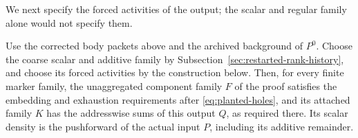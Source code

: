 We next specify the forced activities of the output; the scalar and
regular family alone would not specify them.
\begin{proposition}
\label{prop:corrected-forced-output}
Use the corrected body packets above and the archived background of
$P^0$. Choose the coarse scalar and additive family by
Subsection~\ref{sec:restarted-rank-history}, and choose its forced
activities by the construction below. Then, for every finite marker
family, the unaggregated component family $F$ of the proof satisfies the
embedding and exhaustion requirements after \eqref{eq:planted-holes},
and its attached family $K$ has the addresswise sums of this output
$Q$, as required there. Its scalar density is the pushforward of the actual
input $P$, including its additive remainder.
\end{proposition}

